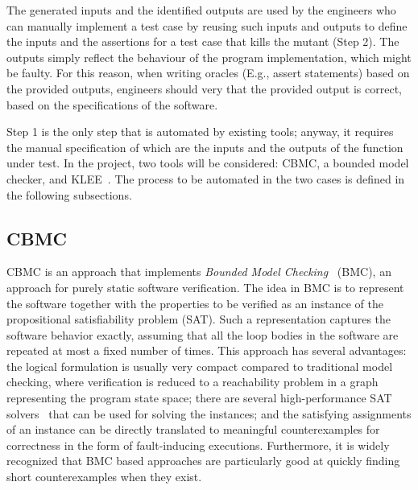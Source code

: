  The generated inputs and the identified outputs are used by the engineers who can manually implement a test case by reusing such inputs and outputs to define the inputs and the assertions for a test case that kills the mutant (Step 2).  The outputs simply reflect the behaviour of the program implementation, which might be faulty. For this reason, when writing oracles (E.g., assert statements) based on the provided outputs, engineers should very that the provided output is correct, based on the specifications of the software.
 


Step 1 is the only step that is automated by existing tools; anyway, it requires the manual specification of which are the inputs and the outputs of the function under test. In the project, two tools will be considered: CBMC, a bounded model checker, and KLEE~\cite{cadar2008klee}. The process to be automated in the two cases is defined in the following subsections.

\subsection{CBMC}
\label{subsec:cbmc}

CBMC is an approach that implements {\em Bounded Model
Checking}~\cite{BiereCCZ:TACAS99,SeryFS:ATVA12} (BMC), an approach for purely static software verification.
The idea in BMC is to represent the software together with the
properties to be verified as an instance of the propositional
satisfiability problem (SAT).  Such a representation captures the
software behavior exactly, assuming that all the loop bodies in the
software are repeated at most a fixed number of times.
%
This approach has several advantages: the logical formulation is usually
very compact compared to traditional model checking, where verification
is reduced to a reachability problem in a graph representing the program
state space;
%
there are several high-performance SAT
solvers~\cite{MarquesSilva:IEEETRAN99,EenS:SAT2003} that can be used for
solving the instances;
%
and the satisfying assignments of an instance can be directly translated
to meaningful counterexamples for correctness in the form of
fault-inducing executions.
%
Furthermore, it is widely recognized that BMC based approaches are particularly good
at quickly finding short counterexamples when they exist.

